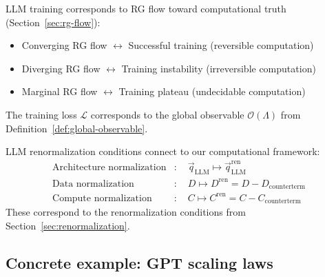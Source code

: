 \begin{proposition}
\label{prop:llm-truth-connection}
LLM training corresponds to RG flow toward computational truth (Section~\ref{sec:rg-flow}):
\begin{itemize}
\item Converging RG flow $\leftrightarrow$ Successful training (reversible computation)
\item Diverging RG flow $\leftrightarrow$ Training instability (irreversible computation)  
\item Marginal RG flow $\leftrightarrow$ Training plateau (undecidable computation)
\end{itemize}
The training loss $\mathcal{L}$ corresponds to the global observable $\mathcal{O}(\Lambda)$ from Definition~\ref{def:global-observable}.
\end{proposition}

\begin{definition}
\label{def:llm-renorm-conditions}
LLM renormalization conditions connect to our computational framework:
\begin{align}
\text{Architecture normalization} &: \quad \vec{q}_{\text{LLM}} \mapsto \vec{q}_{\text{LLM}}^{\text{ren}} \label{eq:llm-arch-renorm} \\
\text{Data normalization} &: \quad D \mapsto D^{\text{ren}} = D - D_{\text{counterterm}} \label{eq:llm-data-renorm} \\
\text{Compute normalization} &: \quad C \mapsto C^{\text{ren}} = C - C_{\text{counterterm}} \label{eq:llm-comp-renorm}
\end{align}
These correspond to the renormalization conditions from Section~\ref{sec:renormalization}.
\end{definition}

\subsection{Concrete example: GPT scaling laws}

